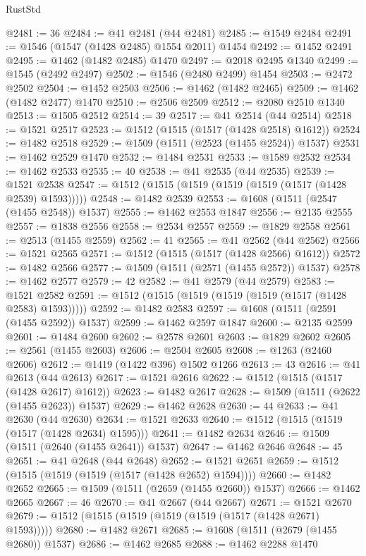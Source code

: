 \begin{lexlean}{RustStd}
\begin{coremodule}
@2481 := 36
@2484 := @41 @2481 (@44 @2481)
@2485 := @1549 @2484
@2491 := @1546 (@1547 (@1428 @2485) @1554 @2011) @1454
@2492 := @1452 @2491
@2495 := @1462 (@1482 @2485) @1470
@2497 := @2018 @2495 @1340
@2499 := @1545 (@2492 @2497)
@2502 := @1546 (@2480 @2499) @1454
@2503 := @2472 @2502
@2504 := @1452 @2503
@2506 := @1462 (@1482 @2465)
@2509 := @1462 (@1482 @2477) @1470
@2510 := @2506 @2509
@2512 := @2080 @2510 @1340
@2513 := @1505 @2512
@2514 := 39
@2517 := @41 @2514 (@44 @2514)
@2518 := @1521 @2517
@2523 := @1512 (@1515 (@1517 (@1428 @2518) @1612))
@2524 := @1482 @2518
@2529 := @1509 (@1511 (@2523 (@1455 @2524)) @1537)
@2531 := @1462 @2529 @1470
@2532 := @1484 @2531
@2533 := @1589 @2532
@2534 := @1462 @2533
@2535 := 40
@2538 := @41 @2535 (@44 @2535)
@2539 := @1521 @2538
@2547 := @1512 (@1515 (@1519 (@1519 (@1519 (@1517 (@1428 @2539) @1593)))))
@2548 := @1482 @2539
@2553 := @1608 (@1511 (@2547 (@1455 @2548)) @1537)
@2555 := @1462 @2553 @1847
@2556 := @2135 @2555
@2557 := @1838 @2556
@2558 := @2534 @2557
@2559 := @1829 @2558
@2561 := @2513 (@1455 @2559)
@2562 := 41
@2565 := @41 @2562 (@44 @2562)
@2566 := @1521 @2565
@2571 := @1512 (@1515 (@1517 (@1428 @2566) @1612))
@2572 := @1482 @2566
@2577 := @1509 (@1511 (@2571 (@1455 @2572)) @1537)
@2578 := @1462 @2577
@2579 := 42
@2582 := @41 @2579 (@44 @2579)
@2583 := @1521 @2582
@2591 := @1512 (@1515 (@1519 (@1519 (@1519 (@1517 (@1428 @2583) @1593)))))
@2592 := @1482 @2583
@2597 := @1608 (@1511 (@2591 (@1455 @2592)) @1537)
@2599 := @1462 @2597 @1847
@2600 := @2135 @2599
@2601 := @1484 @2600
@2602 := @2578 @2601
@2603 := @1829 @2602
@2605 := @2561 (@1455 @2603)
@2606 := @2504 @2605
@2608 := @1263 (@2460 @2606)
@2612 := @1419 (@1422 @396) @1502 @1266
@2613 := 43
@2616 := @41 @2613 (@44 @2613)
@2617 := @1521 @2616
@2622 := @1512 (@1515 (@1517 (@1428 @2617) @1612))
@2623 := @1482 @2617
@2628 := @1509 (@1511 (@2622 (@1455 @2623)) @1537)
@2629 := @1462 @2628
@2630 := 44
@2633 := @41 @2630 (@44 @2630)
@2634 := @1521 @2633
@2640 := @1512 (@1515 (@1519 (@1517 (@1428 @2634) @1595)))
@2641 := @1482 @2634
@2646 := @1509 (@1511 (@2640 (@1455 @2641)) @1537)
@2647 := @1462 @2646
@2648 := 45
@2651 := @41 @2648 (@44 @2648)
@2652 := @1521 @2651
@2659 := @1512 (@1515 (@1519 (@1519 (@1517 (@1428 @2652) @1594))))
@2660 := @1482 @2652
@2665 := @1509 (@1511 (@2659 (@1455 @2660)) @1537)
@2666 := @1462 @2665
@2667 := 46
@2670 := @41 @2667 (@44 @2667)
@2671 := @1521 @2670
@2679 := @1512 (@1515 (@1519 (@1519 (@1519 (@1517 (@1428 @2671) @1593)))))
@2680 := @1482 @2671
@2685 := @1608 (@1511 (@2679 (@1455 @2680)) @1537)
@2686 := @1462 @2685
@2688 := @1462 @2288 @1470

\end{coremodule}
\end{lexlean}
